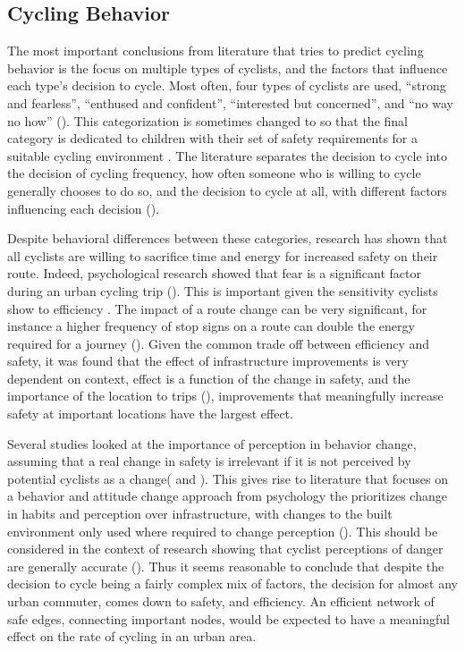 

\subsection{Cycling Behavior}

The most important conclusions from literature that tries to predict cycling behavior is the focus on multiple types of cyclists, and the factors that influence each type's decision to cycle. Most often, four types of cyclists are used, ``strong and fearless'', ``enthused and confident'', ``interested but concerned'', and ``no way no how'' (\cite{dill2013four}). This categorization is sometimes changed to so that the final category is dedicated to children with their set of safety requirements for a suitable cycling environment \cite{mekuria2012}. The literature separates the decision to cycle into the decision of cycling frequency, how often someone who is willing to cycle generally chooses to do so, and the decision to cycle at all, with different factors influencing each decision (\cite{stinson2005comparison}). 

Despite behavioral differences between these categories, research has shown that all cyclists are willing to sacrifice time and energy for increased safety on their route\cite{winters2011motivators}. Indeed, psychological research showed that fear is a significant factor during an urban cycling trip (\cite{ellett2018state}). This is important given the sensitivity cyclists show to efficiency \cite{wuerzer2015cycling}. The impact of a route change can be very significant, for instance a higher frequency of stop signs on a route can double the energy required for a journey (\cite{fajans2001bicyclists}). Given the common trade off between efficiency and safety, it was found that the effect of infrastructure improvements is very dependent on context, effect is a function of the change in safety, and the importance of the location to trips (\cite{kondo2018bike}), improvements that meaningfully increase safety at important locations have the largest effect. 

Several studies looked at the importance of perception in behavior change, assuming that a real change in safety is irrelevant if it is not perceived by potential cyclists as a change(\cite{li2012physical} and \cite{parkin2007models}). This gives rise to literature that focuses on a behavior and attitude change approach from psychology the prioritizes change in habits and perception over infrastructure, with changes to the built environment only used where required to change perception (\cite{savan2017integrated}). This should be considered in the context of research showing that cyclist perceptions of danger are generally accurate (\cite{vandenbulcke2014predicting}). Thus it seems reasonable to conclude that despite the decision to cycle being a fairly complex mix of factors, the decision for almost any urban commuter, comes down to safety, and efficiency. An efficient network of safe edges, connecting important nodes, would be expected to have a meaningful effect on the rate of cycling in an urban area.  


